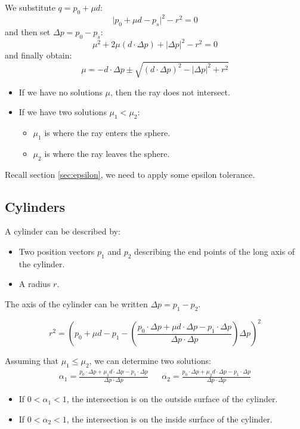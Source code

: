 \documentclass[11pt]{article}
\begin{document}
We substitute $q = p_0 + \mu d$:
\[
  \lvert p_0 + \mu d - p_s \rvert ^2 - r^2 = 0 
\]
and then set $\Delta p = p_0 - p_s$:
\[
  \mu^2 + 2\mu(d \cdot \Delta p) + \lvert \Delta p \rvert ^ 2 - r^2 = 0 
\]
and finally obtain:
\[
  \mu = -d \cdot \Delta p \pm \sqrt{(d \cdot \Delta p) ^2 - \lvert \Delta p \rvert ^2 + r^2} 
\]
\begin{itemize}
  \item If we have no solutions $\mu$, then the ray does not intersect.
  \item If we have two solutions $\mu_1 < \mu_2$:
    \begin{itemize}
      \item $\mu_1$ is where the ray enters the sphere.
      \item $\mu_2$ is where the ray leaves the sphere.
    \end{itemize}
\end{itemize}

Recall section \ref{sec:epsilon}, we need to apply some epsilon tolerance.

\subsection{Cylinders}
A cylinder can be described by:
\begin{itemize}
  \item Two position vectors $p_1$ and $p_2$ describing the end points of the long axis of the cylinder.
  \item A radius $r$.
\end{itemize}
The axis of the cylinder can be written $\Delta p = p_1 - p_2$.

\[
  r^2 = \left( p_0 + \mu d - p_1 - \left( \frac{p_0 \cdot \Delta p + \mu d \cdot \Delta p - p_1 \cdot \Delta p}{\Delta p \cdot \Delta p} \right) \Delta p \right)^2
\]

Assuming that $\mu_1 \leq \mu_2$, we can determine two solutions:
\begin{align*}
  \alpha_1 = \frac{p_0 \cdot \Delta p + \mu_1 d \cdot \Delta p - p_1 \cdot \Delta p}{\Delta p \cdot \Delta p}
  &&
  \alpha_2 = \frac{p_0 \cdot \Delta p + \mu_2 d \cdot \Delta p - p_1 \cdot \Delta p}{\Delta p \cdot \Delta p}
\end{align*}
\begin{itemize}
  \item If $0 < \alpha_1 < 1$, the intersection is on the outside surface of the cylinder.
  \item If $0 < \alpha_2 < 1$, the intersection is on the inside surface of the cylinder.
\end{itemize}
\end{document}
